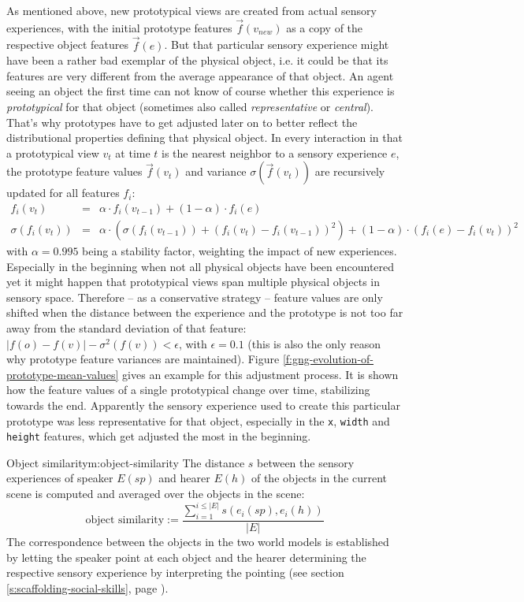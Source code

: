As mentioned above, new prototypical views are created from actual
sensory experiences, with the initial prototype features
$\vec{f}(v_{new})$ as a copy of the respective object features
$\vec{f}(e)$. But that particular sensory experience might have been a
rather bad exemplar of the physical object, i.e. it could be that its
features are very different from the average appearance of that
object. An agent seeing an object the first time can not know of
course whether this experience is \emph{prototypical}
\citep{rosch75family-resemblances} for that object (sometimes also
called \emph{representative} or \emph{central}). That's why prototypes
have to get adjusted later on to better reflect the distributional
properties defining that physical object. In every interaction in that
a prototypical view $v_t$ at time $t$ is the nearest neighbor to a
sensory experience $e$, the prototype feature values $\vec{f}(v_t)$
and variance $\sigma\left(\vec{f}(v_t)\right)$ are recursively updated
for all features $f_i$:
\begin{eqnarray*}f_i(v_t) & = & \alpha \cdot f_i(v_{t-1}) + \left(1 - \alpha\right) \cdot f_i(e) \\
  \sigma\left(f_i(v_t)\right) & = & \alpha \cdot
  \left(\sigma\left(f_i(v_{t-1})\right) + \left(f_i(v_t) -
      f_i(v_{t-1})\right)^2\right) + \left(1 - \alpha\right) \cdot
  \left(f_i(e) - f_i(v_t)\right)^2\end{eqnarray*} with $\alpha=0.995$
being a stability factor, weighting the impact of new experiences.
Especially in the beginning when not all physical objects have been
encountered yet it might happen that prototypical views span multiple
physical objects in sensory space. Therefore -- as a conservative
strategy -- feature values are only shifted when the distance between
the experience and the prototype is not too far away from the standard
deviation of that feature: $|f(o)-f(v)|-\sigma^2\left(f(v)\right) <
\epsilon$, with $\epsilon = 0.1$ (this is also the only reason why
prototype feature variances are maintained). Figure
\ref{f:gng-evolution-of-prototype-mean-values} gives an example for
this adjustment process. It is shown how the feature values of a
single prototypical change over time, stabilizing towards the
end. Apparently the sensory experience used to create this particular
prototype was less representative for that object, especially in the
{\tt x}, {\tt width} and {\tt height} features, which get adjusted the
most in the beginning.

\begin{measure}[b]{Object similarity}{m:object-similarity}
  The distance $s$ between the sensory experiences of speaker $E(sp)$
  and hearer $E(h)$ of the objects in the current scene is computed
  and averaged over the objects in the scene: $$\text{object
    similarity} :=
  \frac{\sum_{i=1}^{i\leq|E|}s\left(e_i(sp),e_i(h)\right)}{|E|}$$ The
  correspondence between the objects in the two world models is
  established by letting the speaker point at each object and the
  hearer determining the respective sensory experience by interpreting
  the pointing (see section \ref{s:scaffolding-social-skills}, page
  \pageref{s:scaffolding-social-skills}).
\end{measure}

